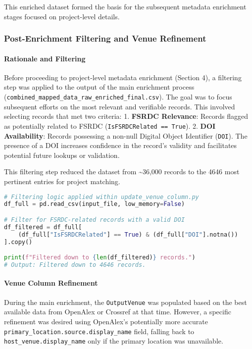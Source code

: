 \documentclass[12pt]{article}
\begin{document}
This enriched dataset formed the basis for the subsequent metadata
enrichment stages focused on project-level details.

\subsubsection{Post-Enrichment Filtering and Venue
Refinement}\label{post-enrichment-filtering-and-venue-refinement}

\paragraph{Rationale and
Filtering}\label{rationale-and-filtering}

Before proceeding to project-level metadata enrichment (Section 4), a
filtering step was applied to the output of the main enrichment process
(\texttt{combined\_mapped\_data\_raw\_enriched\_final.csv}). The goal
was to focus subsequent efforts on the most relevant and verifiable
records. This involved selecting records that met two criteria: 1.
\textbf{FSRDC Relevance}: Records flagged as potentially related to
FSRDC (\texttt{IsFSRDCRelated\ ==\ True}). 2. \textbf{DOI Availability}:
Records possessing a non-null Digital Object Identifier (\texttt{DOI}).
The presence of a DOI increases confidence in the record's validity and
facilitates potential future lookups or validation.

This filtering step reduced the dataset from \textasciitilde36,000
records to the 4646 most pertinent entries for project matching.

\begin{lstlisting}[language=Python]
# Filtering logic applied within update_venue_column.py
df_full = pd.read_csv(input_file, low_memory=False)

# Filter for FSRDC-related records with a valid DOI
df_filtered = df_full[
    (df_full["IsFSRDCRelated"] == True) & (df_full["DOI"].notna())
].copy()

print(f"Filtered down to {len(df_filtered)} records.")
# Output: Filtered down to 4646 records.
\end{lstlisting}

\paragraph{Venue Column
Refinement}\label{venue-column-refinement}

During the main enrichment, the \texttt{OutputVenue} was populated based
on the best available data from OpenAlex or Crossref at that time.
However, a specific refinement was desired using OpenAlex's potentially
more accurate \texttt{primary\_location.source.display\_name} field,
falling back to \texttt{host\_venue.display\_name} only if the primary
location was unavailable.
\end{document}
